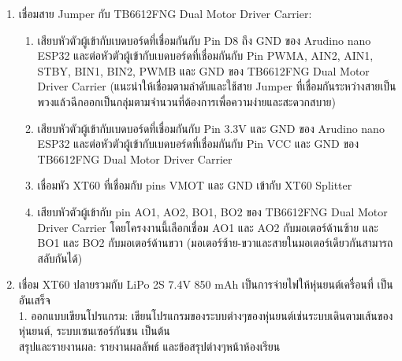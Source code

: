 \documentclass[14pt, fleqn, a4paper]{extarticle}
\begin{document}
\begin{enumerate}
\begin{enumerate}
\begin{enumerate}
\begin{enumerate}
        			\item เสียบหัวตัวผู้เข้ากับเบดบอร์ดที่เชื่อมกันกับ Pin 3.3V และ GND ของ Arudino nano esp32 และต่อหัวตัวเมียเข้ากับ Header ที่เชื่อมกับ Pin VCC และ GND ตามลำดับของ QTRX-MD-08A Reflectance Sensor Array
            		\item เสียบหัวตัวผู้เข้ากับเบดบอร์ดที่เชื่อมกันกับ Pin A0 ถึง A7 ของ Arudino nano esp32 และต่อหัวตัวเมียเข้ากับ Header ที่เชื่อมกับ Pin 1,3,5,7,9,11,13,15 ของ QTRX-MD-08A Reflectance Sensor Array (แนะนำให้เชื่อมตามลำดับและใช้สาย Jumper ที่เชื่อมกันระหว่างสายเป็นพวงแล้วฉีกออกเป็นกลุ่มตามจำนวนที่ต้องการเพื่อความง่ายและสะดวกสบาย)
				\end{enumerate}
			\item เชื่อมสาย Jumper กับ TB6612FNG Dual Motor Driver Carrier: 
			\begin{enumerate}
				\item เสียบหัวตัวผู้เข้ากับเบดบอร์ดที่เชื่อมกันกับ Pin D8 ถึง GND ของ Arudino nano ESP32 และต่อหัวตัวผู้เข้ากับเบดบอร์ดที่เชื่อมกันกับ Pin PWMA, AIN2, AIN1, STBY, BIN1, BIN2, PWMB และ GND ของ TB6612FNG Dual Motor Driver Carrier (แนะนำให้เชื่อมตามลำดับและใช้สาย Jumper ที่เชื่อมกันระหว่างสายเป็นพวงแล้วฉีกออกเป็นกลุ่มตามจำนวนที่ต้องการเพื่อความง่ายและสะดวกสบาย)
				\item เสียบหัวตัวผู้เข้ากับเบดบอร์ดที่เชื่อมกันกับ Pin 3.3V และ GND ของ Arudino nano ESP32 และต่อหัวตัวผู้เข้ากับเบดบอร์ดที่เชื่อมกันกับ Pin VCC และ GND ของ TB6612FNG Dual Motor Driver Carrier
				\item เชื่อมหัว XT60 ที่เชื่อมกับ pins VMOT และ GND เข้ากับ XT60 Splitter
				\item เสียบหัวตัวผู้เข้ากับ pin AO1, AO2, BO1, BO2 ของ TB6612FNG Dual Motor Driver Carrier โดยโครงงานนี้เลือกเชื่อม AO1 และ AO2 กับมอเตอร์ด้านซ้าย และ BO1 และ BO2 กับมอเตอร์ด้านขวา (มอเตอร์ซ้าย-ขวาและสายในมอเตอร์เดียวกันสามารถสลับกันได้)
			\end{enumerate}
			\item เชื่อม XT60 ปลายรวมกับ LiPo 2S 7.4V 850 mAh เป็นการจ่ายไฟให้หุ่นยนต์เครื่อนที่ เป็นอันเสร็จ \\
			1.	ออกแบบเขียนโปรแกรม: เขียนโปรแกรมของระบบต่างๆของหุ่นยนต์เช่นระบบเดินตามเส้นของหุ่นยนต์,  
			ระบบเซนเซอร์กันชน เป็นต้น \\
			สรุปและรายงานผล: รายงานผลลัพธ์ และข้อสรุปต่างๆหน้าห้องเรียน 


\end{enumerate}
\end{enumerate}
\end{enumerate}
\end{document}
